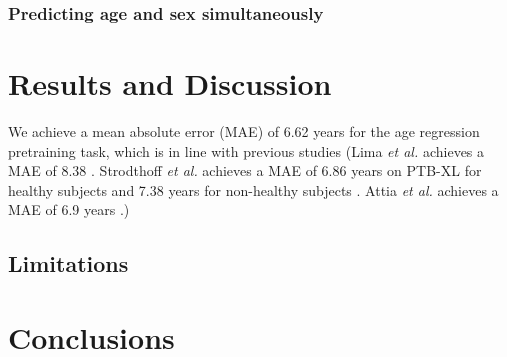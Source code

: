 \documentclass[journal,twoside,web]{ieeecolor}
\begin{document}
\subsubsection{Predicting age and sex simultaneously}


\section{Results and Discussion}
We achieve a mean absolute error (MAE) of 6.62 years for the age regression pretraining task, which is in line with previous studies (Lima \textit{et al.} achieves a MAE of 8.38 \cite{lima2021}. Strodthoff \textit{et al.} achieves a MAE of 6.86 years on PTB-XL for healthy subjects and 7.38 years for non-healthy subjects \cite{strodthoff2020}. Attia \textit{et al.} achieves a MAE of 6.9 years \cite{attia2019}.)

\subsection{Limitations}

\section{Conclusions}



\end{document}
